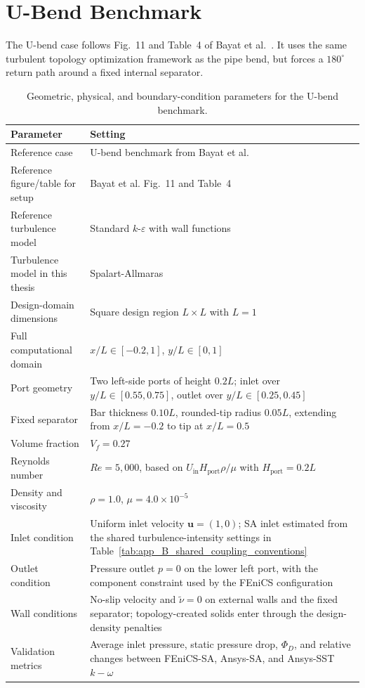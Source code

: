 \FloatBarrier

\section{U-Bend Benchmark}
\label{sec:app_B_config_alexandersen_ubend}

The U-bend case follows Fig.~11 and Table~4 of Bayat et al.~\cite{Bayat2026}. It uses the same turbulent topology optimization framework as the pipe bend, but forces a $180^\circ$ return path around a fixed internal separator.

\begin{table}[htbp]
	\centering
	\footnotesize
	\caption{Geometric, physical, and boundary-condition parameters for the U-bend benchmark.}
	\label{tab:app_B_alexandersen_ubend_physical}
	\renewcommand{\arraystretch}{1.2}
	\begin{tabularx}{\textwidth}{l X}
		\hline
		\textbf{Parameter} & \textbf{Setting} \\
		\hline
		Reference case & U-bend benchmark from Bayat et al.~\cite{Bayat2026} \\
		Reference figure/table for setup & Bayat et al. Fig.~11 and Table~4 \\
		Reference turbulence model & Standard $k$-$\varepsilon$ with wall functions \\
		Turbulence model in this thesis & Spalart-Allmaras \\
		Design-domain dimensions & Square design region $L\times L$ with $L=1$ \\
		Full computational domain & $x/L\in[-0.2,1]$, $y/L\in[0,1]$ \\
		Port geometry & Two left-side ports of height $0.2L$; inlet over $y/L\in[0.55,0.75]$, outlet over $y/L\in[0.25,0.45]$ \\
		Fixed separator & Bar thickness $0.10L$, rounded-tip radius $0.05L$, extending from $x/L=-0.2$ to tip at $x/L=0.5$ \\
		Volume fraction & $V_f=0.27$ \\
		Reynolds number & $Re=5{,}000$, based on $U_{\mathrm{in}}H_{\mathrm{port}}\rho/\mu$ with $H_{\mathrm{port}}=0.2L$ \\
		Density and viscosity & $\rho=1.0$, $\mu=4.0\times10^{-5}$ \\
		Inlet condition & Uniform inlet velocity $\mathbf{u}=(1,0)$; SA inlet estimated from the shared turbulence-intensity settings in Table~\ref{tab:app_B_shared_coupling_conventions} \\
		Outlet condition & Pressure outlet $p=0$ on the lower left port, with the component constraint used by the FEniCS configuration \\
		Wall conditions & No-slip velocity and $\tilde{\nu}=0$ on external walls and the fixed separator; topology-created solids enter through the design-density penalties \\
		Validation metrics & Average inlet pressure, static pressure drop, $\Phi_D$, and relative changes between FEniCS-SA, Ansys-SA, and Ansys-SST $k-\omega$ \\
		\hline
	\end{tabularx}
\end{table}

